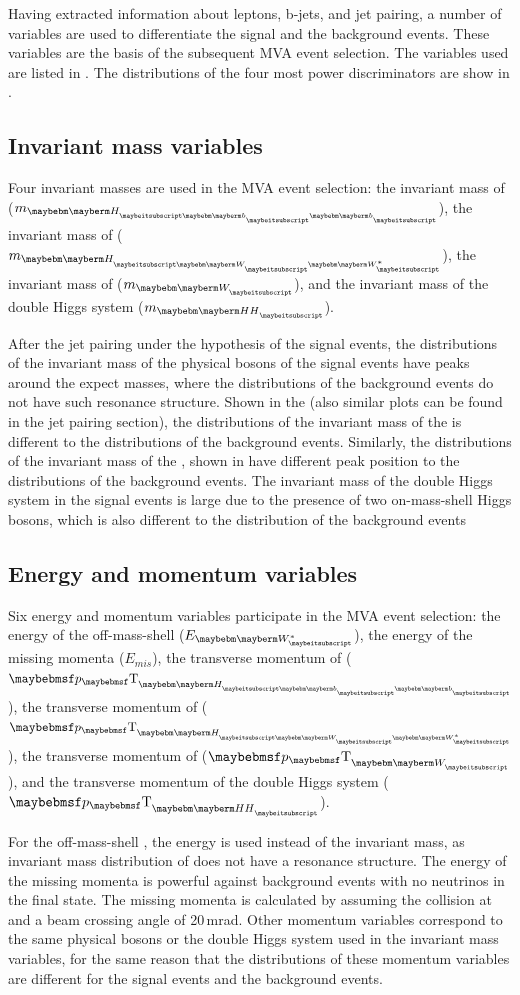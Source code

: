 Having extracted information about leptons, b-jets, and jet pairing, a number of variables are used to differentiate the signal and the background events. These variables are the basis of the subsequent MVA event selection. The variables used are listed in . The distributions of the four most power discriminators are show in .

\subsection{Invariant mass  variables}

Four invariant masses are used in the MVA event selection: the invariant mass of  \Hbb ($m_{\Hbb}$), the invariant mass of  \HWW ($m_{\HWW}$), the invariant mass of  \PW ($m_{\PW}$), and the invariant mass of the double Higgs system ($m_{\HH}$).

After the jet pairing under the hypothesis of the signal events, the distributions of the invariant mass of the physical bosons of the signal events have peaks around the expect masses, where the distributions of the  background events do not have such resonance structure. Shown in the  (also similar plots can be found in the jet pairing section), the distributions of the invariant mass of the \Hbb is  different to the distributions of the background events. Similarly, the distributions of the invariant mass of the \HWW, shown in  have different peak position to the distributions of the background events.  The invariant mass of the double Higgs system in the signal events is large due to the presence of two on-mass-shell Higgs bosons, which is also different to the distribution of the background events

\subsection{Energy and momentum variables}

Six energy and momentum variables participate in the MVA event selection: the energy of the off-mass-shell \PW ($E_{\W*}$), the energy of the missing momenta ($E_{mis}$), the transverse momentum of \Hbb ($\pT_{\Hbb}$), the transverse momentum of \HWW ($\pT_{\HWW}$), the transverse momentum of \PW ($\pT_{\PW}$), and the transverse momentum of the double Higgs system ($\pT_{\HH}$).

For the off-mass-shell \PW, the energy  is used instead of the invariant mass, as invariant mass distribution of \W* does not have a resonance structure. The energy of the missing momenta is powerful against background events with no neutrinos in the final state. The missing momenta is calculated by assuming the collision at \sqrtS and a beam crossing angle of 20\,mrad. Other momentum variables correspond to the same physical bosons or the double Higgs system used in  the invariant mass  variables, for the same reason that the distributions of these momentum variables are different for the signal events and the background events.


